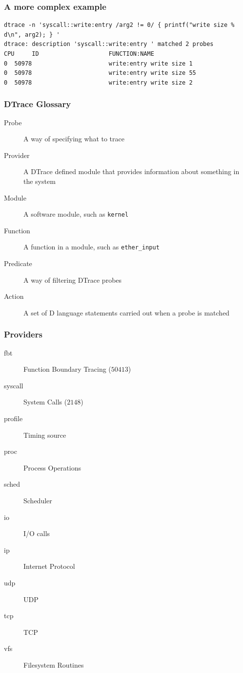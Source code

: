 \documentclass[pdftex]{beamer} %
\begin{document}
\begin{frame}[fragile]
  \frametitle{A more complex example}
\begin{lstlisting}
dtrace -n 'syscall::write:entry /arg2 != 0/ { printf("write size % d\n", arg2); } '
dtrace: description 'syscall::write:entry ' matched 2 probes
CPU     ID                    FUNCTION:NAME
0  50978                      write:entry write size 1
0  50978                      write:entry write size 55
0  50978                      write:entry write size 2
\end{lstlisting}
\end{frame}

\begin{frame}[fragile]
  \frametitle{DTrace Glossary}
  \begin{description}
  \item[Probe] A way of specifying what to trace
  \item[Provider] A DTrace defined module that provides information
    about something in the system
  \item[Module] A software module, such as \Verb+kernel+
  \item[Function] A function in a module, such as \Verb+ether_input+
  \item[Predicate] A way of filtering DTrace probes
  \item[Action] A set of D language statements carried out when a probe
    is matched
  \end{description}
\end{frame}

\begin{frame}
  \frametitle{Providers}
  \begin{description}
  \item[fbt] Function Boundary Tracing ($50413$)
  \item[syscall] System Calls ($2148$)
  \item[profile] Timing source 
  \item[proc] Process Operations 
  \item[sched] Scheduler
  \item[io] I/O calls
  \item[ip] Internet Protocol
  \item[udp] UDP
  \item[tcp] TCP
  \item[vfs] Filesystem Routines
  \end{description}
\end{frame}
\end{document}
